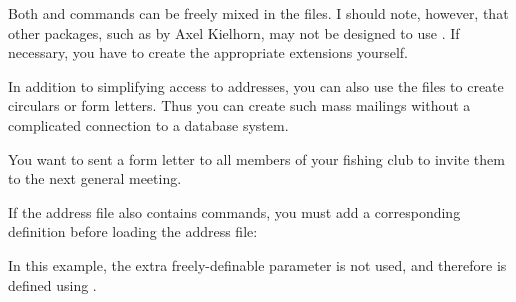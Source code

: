 Both  and  commands can be
freely mixed in the  files. I should note, however, that other
packages, such as  by Axel Kielhorn,
may not be designed to use . If necessary, you have to create
the appropriate extensions yourself.%
%
\EndIndexGroup

In addition to simplifying access to addresses, you can also use the
 files to create circulars or form letters. Thus you can create such
mass mailings without a complicated connection to a database system.
%
\begin{Example}
  You want to sent a form letter to all members of your fishing club to invite
  them to the next general meeting.
  If the address file also contains 
  commands, you must add a corresponding definition before loading the address
  file:
\begin{lstcode}
  \renewcommand*{\addrentry}[9]{%
    \adrentry{#1}{#2}{#3}{#4}{#5}{#6}{#7}{#9}%
  }
\end{lstcode}
  In this example, the extra freely-definable parameter is not used, and
  therefore  is defined using
  .
\end{Example}

